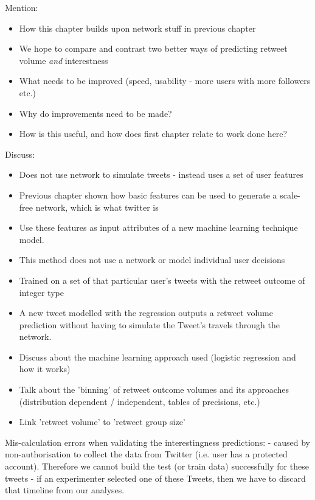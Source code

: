 Mention:
\begin{itemize}
\item How this chapter builds upon network stuff in previous chapter
\item We hope to compare and contrast two better ways of predicting retweet volume \emph{and} interestness
\item What needs to be improved (speed, usability - more users with more followers etc.)
\item Why do improvements need to be made?
\item How is this useful, and how does first chapter relate to work done here?
\end{itemize}

Discuss:
\begin{itemize}
\item Does not use network to simulate tweets - instead uses a set of user features
\item Previous chapter shown how basic features can be used to generate a scale-free network, which is what twitter is
\item Use these features as input attributes of a new machine learning technique model.
\item This method does not use a network or model individual user decisions
\item Trained on a set of that particular user's tweets with the retweet outcome of integer type
\item A new tweet modelled with the regression outputs a retweet volume prediction without having to simulate the Tweet's travels through the network. 
\item Discuss about the machine learning approach used (logistic regression and how it works)
\item Talk about the 'binning' of retweet outcome volumes and its approaches (distribution dependent / independent, tables of precisions, etc.)
\item Link 'retweet volume' to 'retweet group size'
\end{itemize}

Mis-calculation errors when validating the interestingness predictions:
 - caused by non-authorisation to collect the data from Twitter (i.e. user has a protected account). Therefore we cannot build the test (or train data) successfully for these tweets
 - if an experimenter selected one of these Tweets, then we have to discard that timeline from our analyses.
 


